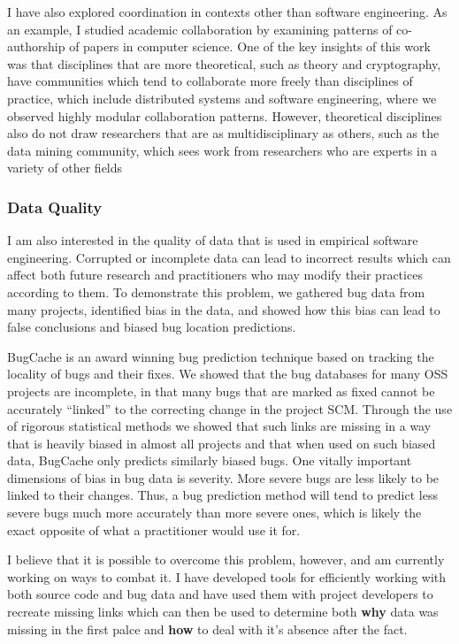 \documentclass[10pt]{article}
\newcommand\Subsection[1]{\subsubsection*{#1}}
\begin{document}
\begin{small}
I have also explored coordination in contexts other than software engineering.
As an example, I studied academic collaboration by examining patterns of
co-authorship of papers in computer science.  One of the key insights of this
work was that disciplines that are more theoretical, such as theory and
cryptography, have communities which tend to collaborate more freely than
disciplines of practice, which include distributed systems and software
engineering, where we observed highly modular collaboration patterns.  However,
theoretical disciplines also do not draw researchers that are as
multidisciplinary as others, such as the data mining community, which sees
work from researchers who are experts in a variety of other fields


\Subsection{Data Quality}

I am also interested in the quality of data that is used in empirical software
engineering.  Corrupted or incomplete data can lead to incorrect results which
can affect both future research and practitioners who may modify their
practices according to them.  To demonstrate this problem, we gathered bug data
from many projects, identified bias in the data, and showed how this bias can
lead to false conclusions and biased bug location predictions.

BugCache is an award winning bug prediction technique based on tracking the
locality of bugs and their fixes.  We showed that the bug databases for many
OSS projects are incomplete, in that many bugs that are marked as fixed cannot
be accurately ``linked'' to the correcting change in the project SCM.  Through
the use of rigorous statistical methods we showed that such links are missing
in a way that is heavily biased in almost all projects and that when used on
such biased data, BugCache only predicts similarly biased bugs.  One vitally
important dimensions of bias in bug data is severity.  More severe bugs are
less likely to be linked to their changes.  Thus, a bug prediction method will
tend to predict less severe bugs much more accurately than more severe ones,
which is likely the exact opposite of what a practitioner would use it for.

I believe that it is possible to overcome this problem, however, and am
currently working on ways to combat it.  I have developed tools for efficiently
working with both source code and bug data and have used them with project
developers to recreate missing links which can then be used to determine both
\textbf{why} data was missing in the first palce and \textbf{how} to deal with
it's absence after the fact.




\end{small}
\end{document}
